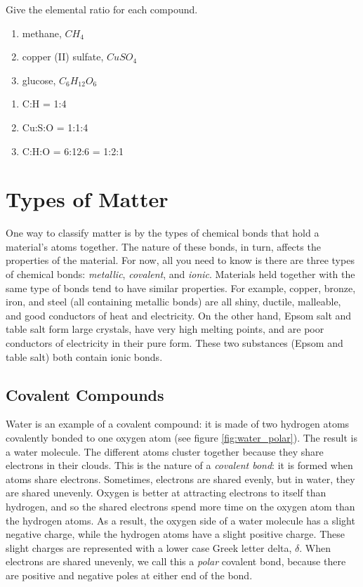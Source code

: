 \begin{Exercise}[title = {Ratios of Atoms in Molecules}, label = num_atom]
Give the elemental ratio for each compound. 
\begin{enumerate}
\item methane, $CH_4$
\item copper (II) sulfate, $CuSO_4$
\item glucose, $C_6H_{12}O_6$
\end{enumerate}
\end{Exercise}

\begin{Answer}[ref = num_atom]
\begin{enumerate}
\item C:H = 1:4
\item Cu:S:O = 1:1:4
\item C:H:O = 6:12:6 = 1:2:1
\end{enumerate}
\end{Answer}

\section{Types of Matter}
One way to classify matter is by the types of chemical bonds that hold a 
material's atoms together. The nature of these bonds, in turn, affects the 
properties of the material. For now, all you need to know is there are three types
of chemical bonds: \textit{metallic}, \textit{covalent}, and \textit{ionic}. Materials held together with the
same type of bonds tend to have similar properties. For example, copper, bronze, 
iron, and steel (all containing metallic bonds) are all shiny, ductile, malleable,
and good conductors of heat and electricity. On the other hand, Epsom salt and 
table salt form large crystals, have very high melting points, and are poor 
conductors of electricity in their pure form. These two substances (Epsom and 
table salt) both contain ionic bonds. 

\subsection{Covalent Compounds}
Water is an example of a covalent compound: it is made of two hydrogen atoms 
covalently bonded to one oxygen atom (see figure \ref{fig:water_polar}). The result 
is a water molecule. The different atoms cluster together 
because they share electrons in their clouds. This is the nature of a 
\textit{covalent bond}: it is formed when atoms share electrons.
Sometimes, electrons are shared evenly, but in water, they are shared unevenly. 
Oxygen is better at attracting electrons to itself than hydrogen, and so the 
shared electrons spend more time on the oxygen atom than the hydrogen 
atoms. As a result, the oxygen side of a water molecule has a slight negative 
charge, while the hydrogen atoms have a slight positive charge. These slight 
charges are represented with a lower case Greek letter delta, $\delta$. When 
electrons are shared unevenly, we call this a \textit{polar} covalent bond, 
because there are positive and negative poles at either end of the bond. 
 

